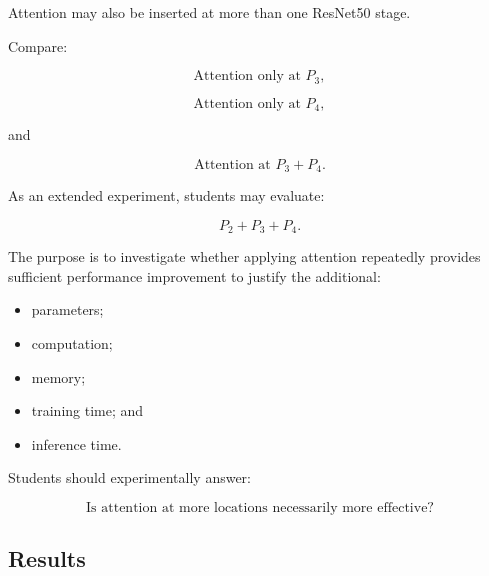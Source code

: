 \documentclass[10pt]{article}
\begin{document}
Attention may also be inserted at more than one ResNet50 stage.

Compare:

\[
\text{Attention only at }P_3,
\]

\[
\text{Attention only at }P_4,
\]

and

\[
\text{Attention at }P_3+P_4.
\]

As an extended experiment, students may evaluate:

\[
P_2+P_3+P_4.
\]

The purpose is to investigate whether applying attention repeatedly provides
sufficient performance improvement to justify the additional:

\begin{itemize}

\item parameters;

\item computation;

\item memory;

\item training time; and

\item inference time.

\end{itemize}

Students should experimentally answer:

\[
\boxed{
\text{Is attention at more locations necessarily more effective?}
}
\]


\subsection*{Results}

\begin{center}
\end{center}
\end{document}
